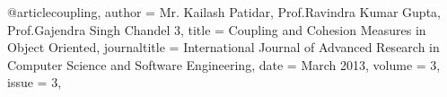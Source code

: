 @article{coupling,
	author = {Mr. Kailash Patidar, Prof.Ravindra Kumar Gupta, Prof.Gajendra Singh Chandel 3},
	title = {Coupling and Cohesion Measures in Object Oriented},
	journaltitle = {International Journal of Advanced Research in
		Computer Science and Software Engineering},
	date = {March 2013},
	volume = {3},
	issue = {3},
}